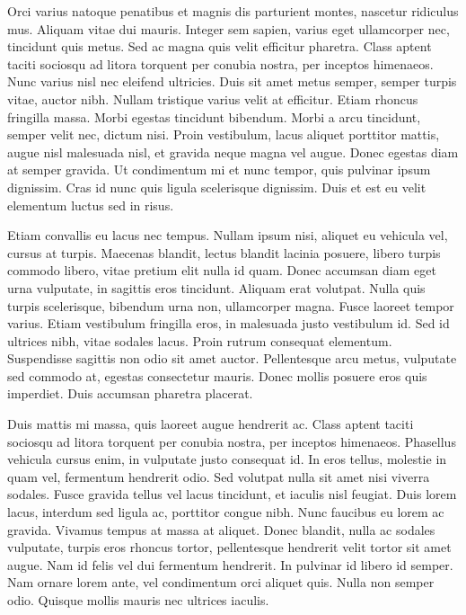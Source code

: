 \documentclass[a4paper,12pt]{report}
\begin{document}
Orci varius natoque penatibus et magnis dis parturient montes, nascetur ridiculus mus. Aliquam vitae dui mauris. Integer sem sapien, varius eget ullamcorper nec, tincidunt quis metus. Sed ac magna quis velit efficitur pharetra. Class aptent taciti sociosqu ad litora torquent per conubia nostra, per inceptos himenaeos. Nunc varius nisl nec eleifend ultricies. Duis sit amet metus semper, semper turpis vitae, auctor nibh. Nullam tristique varius velit at efficitur. Etiam rhoncus fringilla massa. Morbi egestas tincidunt bibendum. Morbi a arcu tincidunt, semper velit nec, dictum nisi. Proin vestibulum, lacus aliquet porttitor mattis, augue nisl malesuada nisl, et gravida neque magna vel augue. Donec egestas diam at semper gravida. Ut condimentum mi et nunc tempor, quis pulvinar ipsum dignissim. Cras id nunc quis ligula scelerisque dignissim. Duis et est eu velit elementum luctus sed in risus.

Etiam convallis eu lacus nec tempus. Nullam ipsum nisi, aliquet eu vehicula vel, cursus at turpis. Maecenas blandit, lectus blandit lacinia posuere, libero turpis commodo libero, vitae pretium elit nulla id quam. Donec accumsan diam eget urna vulputate, in sagittis eros tincidunt. Aliquam erat volutpat. Nulla quis turpis scelerisque, bibendum urna non, ullamcorper magna. Fusce laoreet tempor varius. Etiam vestibulum fringilla eros, in malesuada justo vestibulum id. Sed id ultrices nibh, vitae sodales lacus. Proin rutrum consequat elementum. Suspendisse sagittis non odio sit amet auctor. Pellentesque arcu metus, vulputate sed commodo at, egestas consectetur mauris. Donec mollis posuere eros quis imperdiet. Duis accumsan pharetra placerat.

Duis mattis mi massa, quis laoreet augue hendrerit ac. Class aptent taciti sociosqu ad litora torquent per conubia nostra, per inceptos himenaeos. Phasellus vehicula cursus enim, in vulputate justo consequat id. In eros tellus, molestie in quam vel, fermentum hendrerit odio. Sed volutpat nulla sit amet nisi viverra sodales. Fusce gravida tellus vel lacus tincidunt, et iaculis nisl feugiat. Duis lorem lacus, interdum sed ligula ac, porttitor congue nibh. Nunc faucibus eu lorem ac gravida. Vivamus tempus at massa at aliquet. Donec blandit, nulla ac sodales vulputate, turpis eros rhoncus tortor, pellentesque hendrerit velit tortor sit amet augue. Nam id felis vel dui fermentum hendrerit. In pulvinar id libero id semper. Nam ornare lorem ante, vel condimentum orci aliquet quis. Nulla non semper odio. Quisque mollis mauris nec ultrices iaculis.
\end{document}

